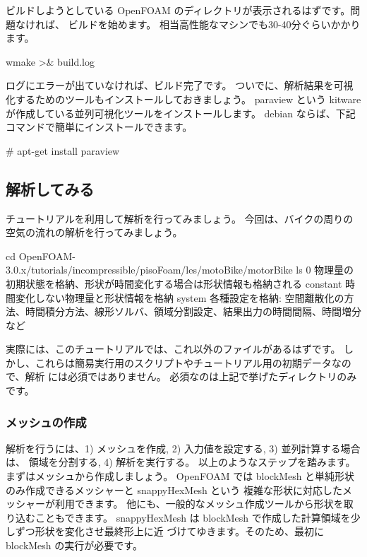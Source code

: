 \documentclass[mingoth,a4paper]{jsarticle}
\begin{document}
ビルドしようとしている OpenFOAM のディレクトリが表示されるはずです。問題なければ、
ビルドを始めます。
相当高性能なマシンでも30-40分ぐらいかかります。

\begin{commandline}
wmake >& build.log
\end{commandline}

ログにエラーが出ていなければ、ビルド完了です。
ついでに、解析結果を可視化するためのツールもインストールしておきましょう。
paraview という kitware が作成している並列可視化ツールをインストールします。
debian ならば、下記コマンドで簡単にインストールできます。

\begin{commandline}
# apt-get install paraview
\end{commandline}

\subsection{解析してみる}
チュートリアルを利用して解析を行ってみましょう。
今回は、バイクの周りの空気の流れの解析を行ってみましょう。

\begin{commandline}
cd OpenFOAM-3.0.x/tutorials/incompressible/pisoFoam/les/motoBike/motorBike
ls
0        物理量の初期状態を格納、形状が時間変化する場合は形状情報も格納される
constant 時間変化しない物理量と形状情報を格納
system   各種設定を格納: 空間離散化の方法、時間積分方法、線形ソルバ、領域分割設定、結果出力の時間間隔、時間増分など
\end{commandline}

実際には、このチュートリアルでは、これ以外のファイルがあるはずです。
しかし、これらは簡易実行用のスクリプトやチュートリアル用の初期データなので、解析
には必須ではありません。
必須なのは上記で挙げたディレクトリのみです。

\subsubsection{メッシュの作成}
解析を行うには、1) メッシュを作成, 2) 入力値を設定する, 3) 並列計算する場合は、
領域を分割する, 4) 解析を実行する。
以上のようなステップを踏みます。まずはメッシュから作成しましょう。
OpenFOAM では blockMesh と単純形状のみ作成できるメッシャーと snappyHexMesh という
複雑な形状に対応したメッシャーが利用できます。
他にも、一般的なメッシュ作成ツールから形状を取り込むこともできます。
snappyHexMesh は blockMesh で作成した計算領域を少しずつ形状を変化させ最終形上に近
づけてゆきます。そのため、最初に blockMesh の実行が必要です。
\end{document}
